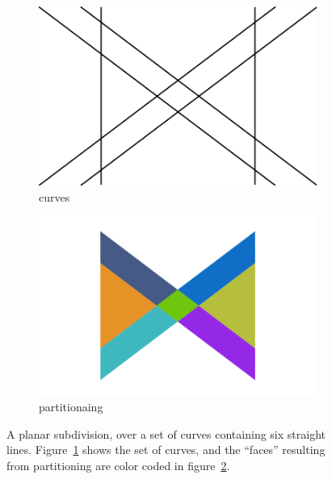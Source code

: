 \begin{figure}%
  \centering
  \begin{subfigure}{.4\textwidth}
    \includegraphics[width=\textwidth]{figures/intro_curves1.png}
    \caption{curves} \label{subfig:intro_curves1}
  \end{subfigure}%
  \quad \quad \quad%
  \begin{subfigure}{.4\textwidth}
    \includegraphics[width=\textwidth]{figures/intro_partitioning1.png}
    \caption{partitionaing} \label{subfig:intro_partitioning1}
  \end{subfigure}%
  \caption[xxx]
          {A planar subdivision, over a set of curves containing six straight lines.
          Figure~\ref{subfig:intro_curves1} shows the set of curves, and the ``faces'' resulting from partitioning are color coded in figure~\ref{subfig:intro_partitioning1}.}
  \label{fig:intro_curvesPartitioning1}
\end{figure}

